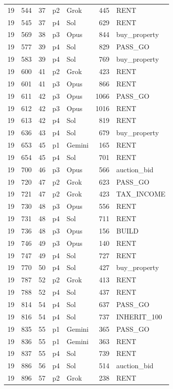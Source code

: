 \begin{longtable}{r r r l l r L{2.2in}}
19 & 544 & 37 & p2 & Grok & 445 & RENT \\
19 & 545 & 37 & p4 & Sol & 629 & RENT \\
19 & 569 & 38 & p3 & Opus & 844 & buy\_property \\
19 & 577 & 39 & p4 & Sol & 829 & PASS\_GO \\
19 & 583 & 39 & p4 & Sol & 769 & buy\_property \\
19 & 600 & 41 & p2 & Grok & 423 & RENT \\
19 & 601 & 41 & p3 & Opus & 866 & RENT \\
19 & 611 & 42 & p3 & Opus & 1066 & PASS\_GO \\
19 & 612 & 42 & p3 & Opus & 1016 & RENT \\
19 & 613 & 42 & p4 & Sol & 819 & RENT \\
19 & 636 & 43 & p4 & Sol & 679 & buy\_property \\
19 & 653 & 45 & p1 & Gemini & 165 & RENT \\
19 & 654 & 45 & p4 & Sol & 701 & RENT \\
19 & 700 & 46 & p3 & Opus & 566 & auction\_bid \\
19 & 720 & 47 & p2 & Grok & 623 & PASS\_GO \\
19 & 721 & 47 & p2 & Grok & 423 & TAX\_INCOME \\
19 & 730 & 48 & p3 & Opus & 556 & RENT \\
19 & 731 & 48 & p4 & Sol & 711 & RENT \\
19 & 736 & 48 & p3 & Opus & 156 & BUILD \\
19 & 746 & 49 & p3 & Opus & 140 & RENT \\
19 & 747 & 49 & p4 & Sol & 727 & RENT \\
19 & 770 & 50 & p4 & Sol & 427 & buy\_property \\
19 & 787 & 52 & p2 & Grok & 413 & RENT \\
19 & 788 & 52 & p4 & Sol & 437 & RENT \\
19 & 814 & 54 & p4 & Sol & 637 & PASS\_GO \\
19 & 816 & 54 & p4 & Sol & 737 & INHERIT\_100 \\
19 & 835 & 55 & p1 & Gemini & 365 & PASS\_GO \\
19 & 836 & 55 & p1 & Gemini & 363 & RENT \\
19 & 837 & 55 & p4 & Sol & 739 & RENT \\
19 & 886 & 56 & p4 & Sol & 514 & auction\_bid \\
19 & 896 & 57 & p2 & Grok & 238 & RENT \\

\end{longtable}
